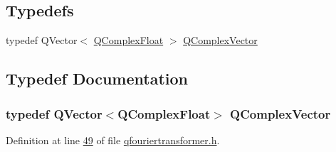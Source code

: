 \subsection*{Typedefs}
\begin{DoxyCompactItemize}
\item 
typedef Q\+Vector$<$ \hyperlink{a00114_ad957a9578f5201ba6cd85e0369965a0e}{Q\+Complex\+Float} $>$ \hyperlink{a00122_a3f6b3838bd0d647c7fe12093694e5c5e}{Q\+Complex\+Vector}
\end{DoxyCompactItemize}


\subsection{Typedef Documentation}
\hypertarget{a00122_a3f6b3838bd0d647c7fe12093694e5c5e}{
\subsubsection[{Q\+Complex\+Vector}]{\setlength{\rightskip}{0pt plus 5cm}typedef Q\+Vector$<${\bf Q\+Complex\+Float}$>$ {\bf Q\+Complex\+Vector}}}\label{a00122_a3f6b3838bd0d647c7fe12093694e5c5e}


Definition at line \hyperlink{a00122_source_l00049}{49} of file \hyperlink{a00122_source}{qfouriertransformer.\+h}.

